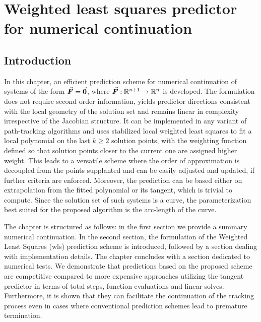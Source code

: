 \chapter{Weighted least squares predictor for numerical continuation}\label{CH5}

\section{Introduction}\label{CH5-S1}

In this chapter, an efficient prediction 
scheme for numerical continuation of systems of the form $\vec{\bm{F}}=\vec{\bm{0}}$, 
where $\vec{\bm{F}}:\mathbb{R}^{n+1}\rightarrow\mathbb{R}^n$ 
is developed. The formulation does not require second order information, yields 
predictor 
directions consistent with the local geometry of the solution set and remains 
linear in complexity irrespective of the Jacobian structure. It can be 
implemented in any variant of path-tracking algorithms and uses
stabilized local
weighted least squares to fit a local polynomial on the last $k\geq 2$ solution
points, with the weighting function defined so that solution points closer to
the current one are assigned higher weight. This leads to a
versatile scheme where the order of approximation is decoupled from the
points supplanted and can be easily adjusted and updated, if further criteria
are enforced. Moreover, the prediction can be based either on extrapolation 
from the fitted polynomial or its tangent, which is trivial to compute. Since
the solution set of such systems is a curve, the parameterization best suited
for the proposed algorithm is the arc-length of the curve. 

The chapter is structured as follows: in the first section we provide a summary 
numerical continuation. In the second section, the formulation of the Weighted 
Least Squares (\acrshort{wls}) prediction scheme is introduced, followed by a 
section dealing with implementation details. The chapter concludes with a 
section dedicated to numerical tests. We
demonstrate that predictions based on the proposed scheme are competitive
compared to more expensive approaches utilizing the tangent predictor in
terms of total steps, function evaluations and linear solves. Furthermore, it
is shown that they can facilitate the continuation of the tracking process 
even in cases where conventional prediction schemes lead to premature
termination. 


